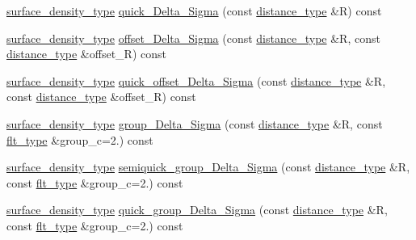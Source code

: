 \begin{DoxyCompactItemize}
\item 
\hyperlink{namespaceIceBRG_a80c597ef5ba0a32491d32a9f0083b02d}{surface\-\_\-density\-\_\-type} \hyperlink{classIceBRG_1_1lensing__profile__extension_a0b950e8cee7faf2c1e1c2bf64bf2cf75}{quick\-\_\-\-Delta\-\_\-\-Sigma} (const \hyperlink{namespaceIceBRG_a45499647eb87e24c10ab32c628711cec}{distance\-\_\-type} \&R) const 
\item 
\hyperlink{namespaceIceBRG_a80c597ef5ba0a32491d32a9f0083b02d}{surface\-\_\-density\-\_\-type} \hyperlink{classIceBRG_1_1lensing__profile__extension_aefc7c55a0d767a972361cad00b1d3719}{offset\-\_\-\-Delta\-\_\-\-Sigma} (const \hyperlink{namespaceIceBRG_a45499647eb87e24c10ab32c628711cec}{distance\-\_\-type} \&R, const \hyperlink{namespaceIceBRG_a45499647eb87e24c10ab32c628711cec}{distance\-\_\-type} \&offset\-\_\-\-R) const 
\item 
\hyperlink{namespaceIceBRG_a80c597ef5ba0a32491d32a9f0083b02d}{surface\-\_\-density\-\_\-type} \hyperlink{classIceBRG_1_1lensing__profile__extension_a8b0e5f63d78f8b5b1fe57ff3cd99b3bd}{quick\-\_\-offset\-\_\-\-Delta\-\_\-\-Sigma} (const \hyperlink{namespaceIceBRG_a45499647eb87e24c10ab32c628711cec}{distance\-\_\-type} \&R, const \hyperlink{namespaceIceBRG_a45499647eb87e24c10ab32c628711cec}{distance\-\_\-type} \&offset\-\_\-\-R) const 
\item 
\hyperlink{namespaceIceBRG_a80c597ef5ba0a32491d32a9f0083b02d}{surface\-\_\-density\-\_\-type} \hyperlink{classIceBRG_1_1lensing__profile__extension_a3d999f7604502abde8299dc8fb0fe6b0}{group\-\_\-\-Delta\-\_\-\-Sigma} (const \hyperlink{namespaceIceBRG_a45499647eb87e24c10ab32c628711cec}{distance\-\_\-type} \&R, const \hyperlink{lib_2IceBRG__main_2common_8h_ad0f130a56eeb944d9ef2692ee881ecc4}{flt\-\_\-type} \&group\-\_\-c=2.) const 
\item 
\hyperlink{namespaceIceBRG_a80c597ef5ba0a32491d32a9f0083b02d}{surface\-\_\-density\-\_\-type} \hyperlink{classIceBRG_1_1lensing__profile__extension_aa639895935b45fb171d5758d3964085d}{semiquick\-\_\-group\-\_\-\-Delta\-\_\-\-Sigma} (const \hyperlink{namespaceIceBRG_a45499647eb87e24c10ab32c628711cec}{distance\-\_\-type} \&R, const \hyperlink{lib_2IceBRG__main_2common_8h_ad0f130a56eeb944d9ef2692ee881ecc4}{flt\-\_\-type} \&group\-\_\-c=2.) const 
\item 
\hyperlink{namespaceIceBRG_a80c597ef5ba0a32491d32a9f0083b02d}{surface\-\_\-density\-\_\-type} \hyperlink{classIceBRG_1_1lensing__profile__extension_ae8f57fbc0c0cbc697d3973d831337295}{quick\-\_\-group\-\_\-\-Delta\-\_\-\-Sigma} (const \hyperlink{namespaceIceBRG_a45499647eb87e24c10ab32c628711cec}{distance\-\_\-type} \&R, const \hyperlink{lib_2IceBRG__main_2common_8h_ad0f130a56eeb944d9ef2692ee881ecc4}{flt\-\_\-type} \&group\-\_\-c=2.) const 

\end{DoxyCompactItemize}
